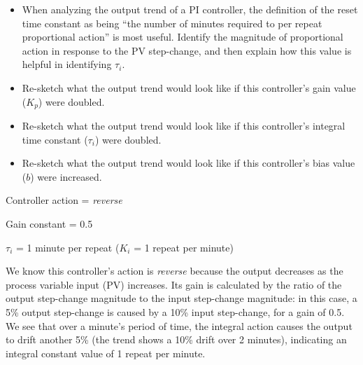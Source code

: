 \begin{itemize}
\item{} When analyzing the output trend of a PI controller, the definition of the reset time constant as being ``the number of minutes required to per repeat proportional action'' is most useful.  Identify the magnitude of proportional action in response to the PV step-change, and then explain how this value is helpful in identifying $\tau_i$.
\item{} Re-sketch what the output trend would look like if this controller's gain value ($K_p$) were doubled.
\item{} Re-sketch what the output trend would look like if this controller's integral time constant ($\tau_i$) were doubled.
\item{} Re-sketch what the output trend would look like if this controller's bias value ($b$) were increased.
\end{itemize}







Controller action = {\it reverse}
 
\vskip 10pt

Gain constant = 0.5
 
\vskip 10pt

$\tau_i$ = 1 minute per repeat ($K_i$ = 1 repeat per minute)
 






We know this controller's action is {\it reverse} because the output decreases as the process variable input (PV) increases.  Its gain is calculated by the ratio of the output step-change magnitude to the input step-change magnitude: in this case, a 5\% output step-change is caused by a 10\% input step-change, for a gain of 0.5.  We see that over a minute's period of time, the integral action causes the output to drift another 5\% (the trend shows a 10\% drift over 2 minutes), indicating an integral constant value of 1 repeat per minute.




